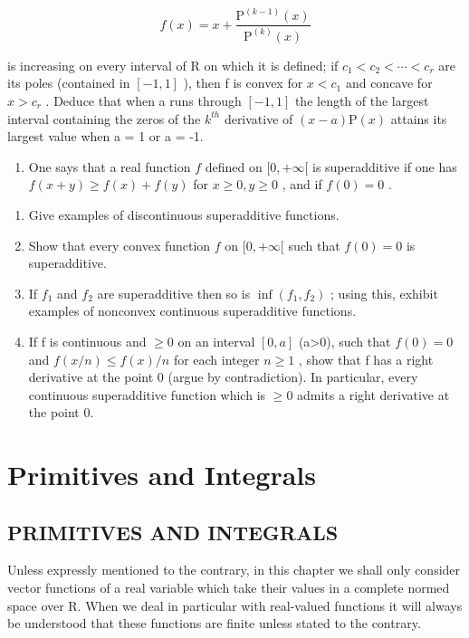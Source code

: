 \[
f (x) = x + \frac {\mathrm{P} ^ {(k - 1)} (x)}{\mathrm{P} ^ {(k)} (x)}
\]

is increasing on every interval of R on which it is defined; if \(c_{1} < c_{2} < \cdots < c_{r}\) are its poles (contained in \([-1, 1]\) ), then f is convex for \(x < c_{1}\) and concave for \(x > c_{r}\) . Deduce that when a runs through \([-1, 1]\) the length of the largest interval containing the zeros of the \(k^{th}\) derivative of \((x - a)\mathrm{P}(x)\) attains its largest value when a = 1 or a = -1.

\begin{enumerate}
\def\labelenumi{\arabic{enumi})}
\setcounter{enumi}{24}
\tightlist
\item
  One says that a real function \(f\) defined on \([0, +\infty[\) is superadditive if one has \(f(x + y) \geqslant f(x) + f(y)\) for \(x \geqslant 0, y \geqslant 0\) , and if \(f(0) = 0\) .
\end{enumerate}

\begin{enumerate}
\def\labelenumi{\alph{enumi})}
\item
  Give examples of discontinuous superadditive functions.
\item
  Show that every convex function \(f\) on \([0, +\infty[\) such that \(f(0) = 0\) is superadditive.
\item
  If \(f_{1}\) and \(f_{2}\) are superadditive then so is \(\inf (f_1, f_2)\) ; using this, exhibit examples of nonconvex continuous superadditive functions.
\item
  If f is continuous and \(\geqslant0\) on an interval \([0,a]\) (a\textgreater0), such that \(f(0)=0\) and \(f(x/n)\leqslant f(x)/n\) for each integer \(n\geqslant1\) , show that f has a right derivative at the point 0 (argue by contradiction). In particular, every continuous superadditive function which is \(\geqslant0\) admits a right derivative at the point 0.
\end{enumerate}

\chapter{Primitives and Integrals}

\section{PRIMITIVES AND INTEGRALS}

Unless expressly mentioned to the contrary, in this chapter we shall only consider vector functions of a real variable which take their values in a complete normed space over R. When we deal in particular with real-valued functions it will always be understood that these functions are finite unless stated to the contrary.

